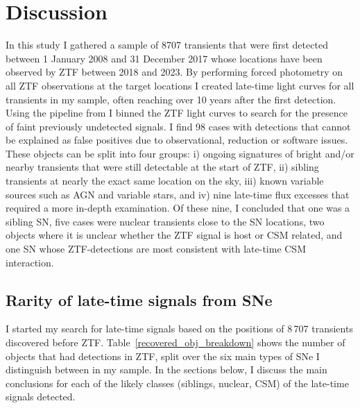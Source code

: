 \documentclass[a4paper,oneside,12pt, class=Latex/Classes/PhDthesisPSnPDF, crop=false]{standalone}
\begin{document}
\section{Discussion}
\label{Pre-ZTF_discussion}
In this study I gathered a sample of 8707 transients that were first detected between 1 January 2008 and 31 December 2017 whose locations have been observed by ZTF between 2018 and 2023. By performing forced photometry on all ZTF observations at the target locations I created late-time light curves for all transients in my sample, often reaching over 10 years after the first detection. Using the pipeline from \citet{Terwel_2024_paper1} I binned the ZTF light curves to search for the presence of faint previously undetected signals. I find 98 cases with detections that cannot be explained as false positives due to observational, reduction or software issues. These objects can be split into four groups: i) ongoing signatures of bright and/or nearby transients that were still detectable at the start of ZTF, ii) sibling transients at nearly the exact same location on the sky, iii) known variable sources such as AGN and variable stars, and iv) nine late-time flux excesses that required a more in-depth examination. Of these nine, I concluded that one was a sibling SN, five cases were nuclear transients close to the SN locations, two objects where it is unclear whether the ZTF signal is host or CSM related, and one SN whose ZTF-detections are most consistent with late-time CSM interaction.


\subsection{Rarity of late-time signals from SNe}
I started my search for late-time signals based on the positions of 8\,707 transients discovered before ZTF. Table~\ref{recovered_obj_breakdown} shows the number of objects that had detections in ZTF, split over the six main types of SNe I distinguish between in my sample. In the sections below, I discuss the main conclusions for each of the likely classes (siblings, nuclear, CSM) of the late-time signals detected.
\end{document}
